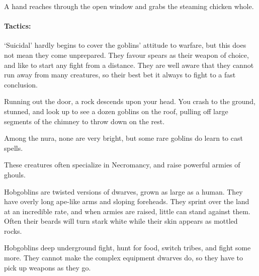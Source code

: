 \begin{multicols}{2}
\begin{boxtext}

  A hand reaches through the open window and grabs the steaming chicken whole.

\end{boxtext}


\paragraph{Tactics:} `Suicidal' hardly begins to cover the goblins' attitude to warfare, but this does not mean they come unprepared.
They favour spears as their weapon of choice, and like to start any fight from a distance.
They are well aware that they cannot run away from many creatures, so their best bet it always to fight to a fast conclusion.

\begin{boxtext}

  Running out the door, a rock descends upon your head.
  You crash to the ground, stunned, and look up to see a dozen goblins on the roof, pulling off large segments of the chimney to throw down on the rest.

\end{boxtext}


\label{goblinnuramancer}

Among the nura, none are very bright, but some rare goblins do learn to cast spells.

These creatures often specialize in Necromancy, and raise powerful armies of ghouls.


\label{hobgoblin}

Hobgoblins are twisted versions of dwarves, grown as large as a human.
They have overly long ape-like arms and sloping foreheads.
They sprint over the land at an incredible rate, and when armies are raised, little can stand against them.
Often their beards will turn stark white while their skin appears as mottled rocks.
 

Hobgoblins deep underground fight, hunt for food, switch tribes, and fight some more.  They cannot make the complex equipment dwarves do, so they have to pick up weapons as they go.


\end{multicols}
